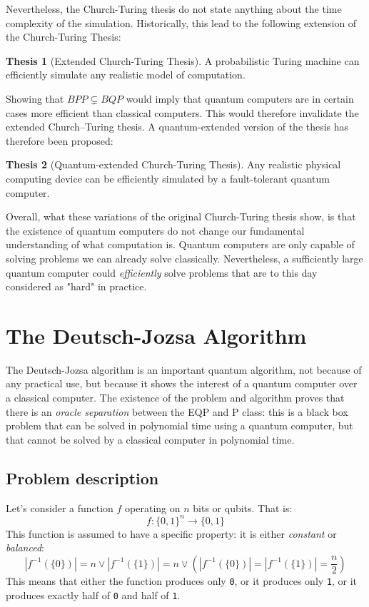 \documentclass[12pt,a4paper]{article}
\theoremstyle{plain}
\theoremstyle{definition}
\newtheorem*{thesis}{Thesis}
\begin{document}
Nevertheless, the Church-Turing thesis do not state anything about the time complexity of the simulation. Historically, this lead to the following extension of the Church-Turing Thesis:
\begin{thesis}[Extended Church-Turing Thesis]
    A probabilistic Turing machine can efficiently simulate any realistic model of computation.
\end{thesis}

Showing that $BPP \varsubsetneq BQP$ would imply that quantum computers are in certain cases more efficient than classical computers. This would therefore invalidate the extended Church–Turing thesis. A quantum-extended version of the thesis has therefore been proposed\cite{quantum-applied}:
\begin{thesis}[Quantum-extended Church-Turing Thesis]
    Any realistic physical computing device can be efficiently simulated by a fault-tolerant quantum computer.
\end{thesis}

Overall, what these variations of the original Church-Turing thesis show, is that the existence of quantum computers do not change our fundamental understanding of what computation is. Quantum computers are only capable of solving problems we can already solve classically. Nevertheless, a sufficiently large quantum computer could \emph{efficiently} solve problems that are to this day considered as "hard" in practice. 

\section{The Deutsch-Jozsa Algorithm}
The Deutsch-Jozsa algorithm\cite{deutsch-jozsa} is an important quantum algorithm, not because of any practical use, but because it shows the interest of a quantum computer over a classical computer. The existence of the problem and algorithm proves that there is an \emph{oracle separation} between the EQP and P class: this is a black box problem that can be solved in polynomial time using a quantum computer, but that cannot be solved by a classical computer in polynomial time.

\subsection{Problem description}
Let's consider a function $f$ operating on $n$ bits or qubits. That is:
\begin{equation*}
    f : \{ 0, 1 \}^n \to \{ 0, 1 \}
\end{equation*}
This function is assumed to have a specific property: it is either \emph{constant} or \emph{balanced}:
\begin{equation*}
    |f^{-1}(\{0\})| = n \lor |f^{-1}(\{1\})| = n \lor \left(|f^{-1}(\{0\})| = |f^{-1}(\{1\})| = \frac{n}{2}\right)
\end{equation*}
This means that either the function produces only \texttt{0}, or it produces only \texttt{1}, or it produces exactly half of \texttt{0} and half of \texttt{1}.
\end{document}
